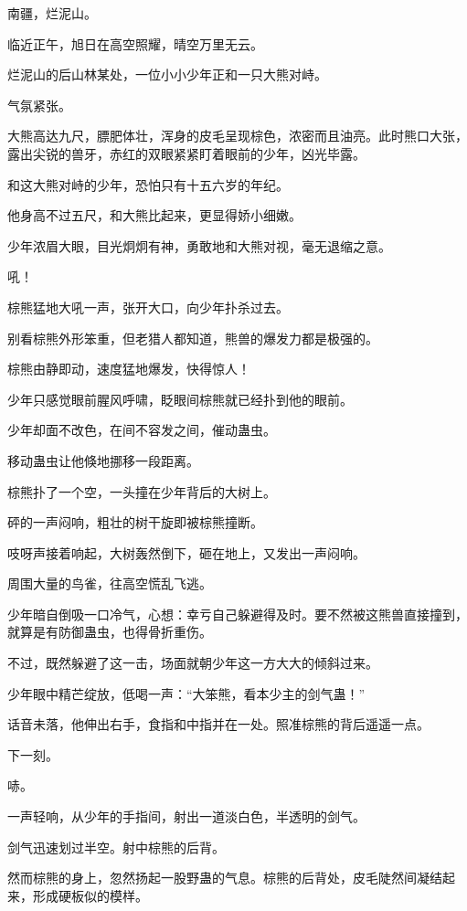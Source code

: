 
\begin{this_body}

南疆，烂泥山。

临近正午，旭日在高空照耀，晴空万里无云。

烂泥山的后山林某处，一位小小少年正和一只大熊对峙。

气氛紧张。

大熊高达九尺，膘肥体壮，浑身的皮毛呈现棕色，浓密而且油亮。此时熊口大张，露出尖锐的兽牙，赤红的双眼紧紧盯着眼前的少年，凶光毕露。

和这大熊对峙的少年，恐怕只有十五六岁的年纪。

他身高不过五尺，和大熊比起来，更显得娇小细嫩。

少年浓眉大眼，目光炯炯有神，勇敢地和大熊对视，毫无退缩之意。

吼！

棕熊猛地大吼一声，张开大口，向少年扑杀过去。

别看棕熊外形笨重，但老猎人都知道，熊兽的爆发力都是极强的。

棕熊由静即动，速度猛地爆发，快得惊人！

少年只感觉眼前腥风呼啸，眨眼间棕熊就已经扑到他的眼前。

少年却面不改色，在间不容发之间，催动蛊虫。

移动蛊虫让他倏地挪移一段距离。

棕熊扑了一个空，一头撞在少年背后的大树上。

砰的一声闷响，粗壮的树干旋即被棕熊撞断。

吱呀声接着响起，大树轰然倒下，砸在地上，又发出一声闷响。

周围大量的鸟雀，往高空慌乱飞逃。

少年暗自倒吸一口冷气，心想：幸亏自己躲避得及时。要不然被这熊兽直接撞到，就算是有防御蛊虫，也得骨折重伤。

不过，既然躲避了这一击，场面就朝少年这一方大大的倾斜过来。

少年眼中精芒绽放，低喝一声：“大笨熊，看本少主的剑气蛊！”

话音未落，他伸出右手，食指和中指并在一处。照准棕熊的背后遥遥一点。

下一刻。

哧。

一声轻响，从少年的手指间，射出一道淡白色，半透明的剑气。

剑气迅速划过半空。射中棕熊的后背。

然而棕熊的身上，忽然扬起一股野蛊的气息。棕熊的后背处，皮毛陡然间凝结起来，形成硬板似的模样。


\end{this_body}

